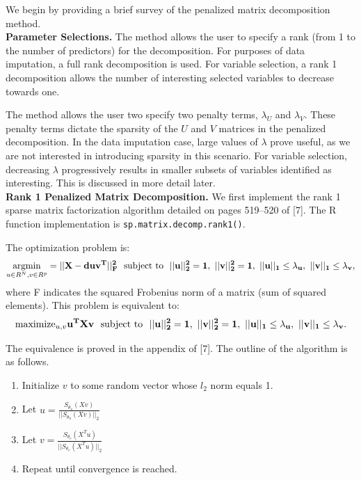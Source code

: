 \documentclass{article}
\newcommand{\myindent}{\hspace*{1cm}}
\DeclareMathOperator*{\argmin}{argmin}
\begin{document}
We begin by providing a brief survey of the penalized matrix decomposition method.\\

\textbf{Parameter Selections.} The method allows the user to specify a rank (from 1 to the number of predictors) for the decomposition.  For purposes of data imputation, a full rank decomposition is used.  For variable selection, a rank 1 decomposition allows the number of interesting selected variables to decrease towards one.

The method allows the user two specify two penalty terms, $\lambda_U$ and $\lambda_V$.  These penalty terms dictate the sparsity of the $U$ and $V$ matrices in the penalized decomposition.  In the data imputation case, large values of $\lambda$ prove useful, as we are not interested in introducing sparsity in this scenario.  For variable selection, decreasing $\lambda$ progressively results in smaller subsets of variables identified as interesting.  This is discussed in more detail later.\\

\textbf{Rank 1 Penalized Matrix Decomposition.} We first implement the rank 1 sparse matrix factorization algorithm detailed on pages 519--520 of [7]. The R function implementation is {\tt sp.matrix.decomp.rank1()}.

The optimization problem is:
%
%
$$\argmin\limits_{u \in R^N, v \in R^p} = ||\bf{X} - d\bf{uv}^T||_F^2 \mskip12mu\hbox{subject to}\mskip12mu ||u||_2^2 = 1,\ ||v||_2^2 = 1,\ ||u||_1 \leq \lambda_u,\ ||v||_1 \leq \lambda_v,$$
%
where F indicates the squared Frobenius norm of a matrix (sum of squared elements).  This problem is equivalent to:
$$\text{maximize}_{u,v}\bf{ u^TXv}\mskip12mu\hbox{subject to}\mskip12mu ||u||_2^2 = 1,\ ||v||_2^2 = 1,\ ||u||_1 \leq \lambda_u,\ ||v||_1 \leq \lambda_v.$$

The equivalence is proved in the appendix of [7].  The outline of the algorithm is as follows.

\begin{enumerate}
	\item Initialize $v$ to some random vector whose $l_2$ norm equals 1.
	\item Let $u = \frac{S_{\theta_u}(Xv)} {||S_{\theta_u}(Xv)||_2}$
	\item Let $v = \frac{S_{\theta_v}(X^T u)} {||S_{\theta_v}(X^T u)||_2}$
	\item Repeat until convergence is reached.
\end{enumerate}
\end{document}
